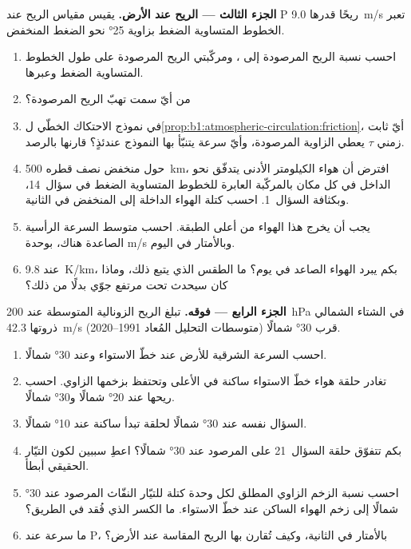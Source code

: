 \begin{problem}
\medskip
\noindent\textbf{الجزء الثالث --- الريح عند الأرض.} يقيس مقياس الريح عند P ريحًا قدرها \qty{9.0}{m/s} تعبر الخطوط المتساوية الضغط بزاوية \ang{25} نحو الضغط المنخفض.
\begin{enumerate}[resume]
  \item احسب نسبة الريح المرصودة إلى ، ومركّبتي الريح المرصودة على طول الخطوط المتساوية الضغط وعبرها.
  \item من أيّ سمت تهبّ الريح المرصودة؟
  \item في نموذج الاحتكاك الخطّي ل\cref{prop:b1:atmospheric-circulation:friction}، أيّ ثابت زمني $\tau$ يعطي الزاوية المرصودة، وأيّ سرعة يتنبّأ بها النموذج عندئذٍ؟ قارنها بالرصد.
  \item حول منخفض نصف قطره \qty{500}{km}، افترض أن هواء الكيلومتر الأدنى يتدفّق نحو الداخل في كل مكان بالمركّبة العابرة للخطوط المتساوية الضغط في سؤال~14، وبكثافة السؤال~1. احسب كتلة الهواء الداخلة إلى المنخفض في الثانية.
  \item يجب أن يخرج هذا الهواء من أعلى الطبقة. احسب متوسط السرعة الرأسية الصاعدة هناك، بوحدة \unit{m/s} وبالأمتار في اليوم.
  \item عند  \qty{9.8}{K/km}، بكم يبرد الهواء الصاعد في يوم؟ ما الطقس الذي يتبع ذلك، وماذا كان سيحدث تحت مرتفع جوّي بدلًا من ذلك؟
\end{enumerate}

\medskip
\noindent\textbf{الجزء الرابع ---  فوقه.} تبلغ الريح الزونالية المتوسطة عند \qty{200}{hPa} في الشتاء الشمالي ذروتها \qty{42.3}{m/s} قرب \ang{30} شمالًا (متوسطات التحليل المُعاد 1991--2020).
\begin{enumerate}[resume]
  \item احسب السرعة الشرقية للأرض عند خطّ الاستواء وعند \ang{30} شمالًا.
  \item تغادر حلقة هواء خطّ الاستواء ساكنة في الأعلى وتحتفظ بزخمها الزاوي. احسب ريحها عند \ang{20} شمالًا و\ang{30} شمالًا.
  \item السؤال نفسه عند \ang{30} شمالًا لحلقة تبدأ ساكنة عند \ang{10} شمالًا.
  \item بكم تتفوّق حلقة السؤال~21 على  المرصود عند \ang{30} شمالًا؟ اعطِ سببين لكون التيّار الحقيقي أبطأ.
  \item احسب نسبة الزخم الزاوي المطلق لكل وحدة كتلة للتيّار النفّاث المرصود عند \ang{30} شمالًا إلى زخم الهواء الساكن عند خطّ الاستواء. ما الكسر الذي فُقد في الطريق؟
  \item ما سرعة  عند P، بالأمتار في الثانية، وكيف تُقارن بها الريح المقاسة عند الأرض؟
\end{enumerate}
\end{problem}
